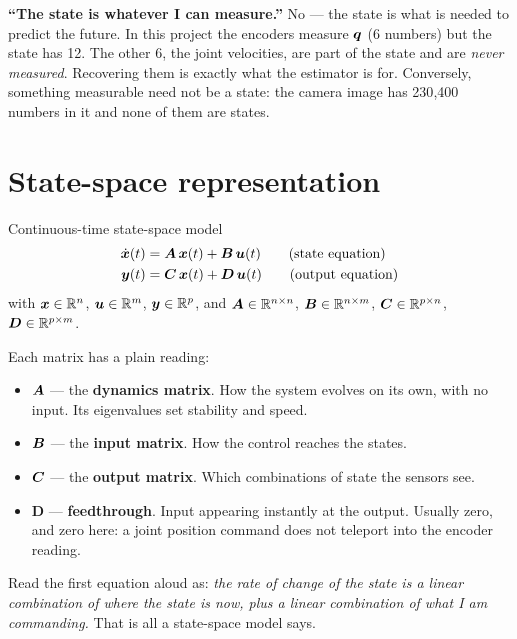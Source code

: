 \begin{pitfall}
\textbf{``The state is whatever I can measure.''} No --- the state is what is needed to predict the future.
In this project the encoders measure $\bm{q}$ (6 numbers) but the state has 12. The other 6, the joint
velocities, are part of the state and are \emph{never measured}. Recovering them is exactly what the
estimator is for. Conversely, something measurable need not be a state: the camera image has 230{,}400
numbers in it and none of them are states.
\end{pitfall}

\section{State-space representation}

\begin{definition}{Continuous-time state-space model}
\begin{align}
\dot{\bm{x}}(t) &= \bm{A}\,\bm{x}(t) + \bm{B}\,\bm{u}(t) \qquad \text{(state equation)}\\
\bm{y}(t) &= \bm{C}\,\bm{x}(t) + \bm{D}\,\bm{u}(t) \qquad \text{(output equation)}
\end{align}
with $\bm{x} \in \mathbb{R}^n$, $\bm{u} \in \mathbb{R}^m$, $\bm{y} \in \mathbb{R}^p$, and
$\bm{A} \in \mathbb{R}^{n \times n}$, $\bm{B} \in \mathbb{R}^{n \times m}$, $\bm{C} \in \mathbb{R}^{p \times n}$, $\bm{D} \in \mathbb{R}^{p \times m}$.
\end{definition}

Each matrix has a plain reading:

\begin{itemize}
\item $\bm{A}$ --- the \textbf{dynamics matrix}. How the system evolves on its own, with no input. Its
      eigenvalues set stability and speed.
\item $\bm{B}$ --- the \textbf{input matrix}. How the control reaches the states.
\item $\bm{C}$ --- the \textbf{output matrix}. Which combinations of state the sensors see.
\item $\bm{D}$ --- \textbf{feedthrough}. Input appearing instantly at the output. Usually zero, and zero
      here: a joint position command does not teleport into the encoder reading.
\end{itemize}

\begin{intuition}
Read the first equation aloud as: \emph{the rate of change of the state is a linear combination of where
the state is now, plus a linear combination of what I am commanding.} That is all a state-space model says.
\end{intuition}


